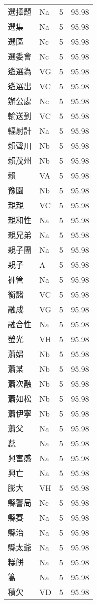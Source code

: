 \documentclass[twocolumn]{book}
\begin{document}
\begin{supertabular}{llrr}
選擇題 & Na & 5 &  95.98\\
選集 & Na & 5 &  95.98\\
選區 & Nc & 5 &  95.98\\
選委會 & Nc & 5 &  95.98\\
遴選為 & VG & 5 &  95.98\\
遴選出 & VC & 5 &  95.98\\
辦公處 & Nc & 5 &  95.98\\
輸送到 & VC & 5 &  95.98\\
輻射計 & Na & 5 &  95.98\\
賴聲川 & Nb & 5 &  95.98\\
賴茂州 & Nb & 5 &  95.98\\
賴 & VA & 5 &  95.98\\
豫園 & Nb & 5 &  95.98\\
親親 & VC & 5 &  95.98\\
親和性 & Na & 5 &  95.98\\
親兄弟 & Na & 5 &  95.98\\
親子團 & Na & 5 &  95.98\\
親子 & A & 5 &  95.98\\
褲管 & Na & 5 &  95.98\\
衡諸 & VC & 5 &  95.98\\
融成 & VG & 5 &  95.98\\
融合性 & Na & 5 &  95.98\\
螢光 & VH & 5 &  95.98\\
蕭婦 & Nb & 5 &  95.98\\
蕭某 & Nb & 5 &  95.98\\
蕭次融 & Nb & 5 &  95.98\\
蕭如松 & Nb & 5 &  95.98\\
蕭伊寧 & Nb & 5 &  95.98\\
蕭父 & Na & 5 &  95.98\\
蕊 & Na & 5 &  95.98\\
興奮感 & Na & 5 &  95.98\\
興亡 & Na & 5 &  95.98\\
膨大 & VH & 5 &  95.98\\
縣警局 & Nc & 5 &  95.98\\
縣賽 & Na & 5 &  95.98\\
縣治 & Na & 5 &  95.98\\
縣太爺 & Na & 5 &  95.98\\
糕餅 & Na & 5 &  95.98\\
篙 & Na & 5 &  95.98\\
積欠 & VD & 5 &  95.98\\

\end{supertabular}
\end{document}
